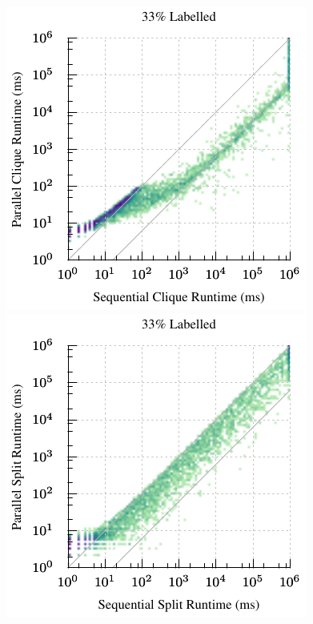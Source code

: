 \documentclass{llncs}
\begin{document}
\begin{figure}[p]
    \vspace*{2em}
    \centering
    \hspace*{0.5em}\includegraphics*[scale=0.7]{plots/33ved-par-heatmap-clique.pdf}\hfill
    \includegraphics*[scale=0.7]{plots/33ved-par-heatmap-james.pdf}\hspace*{0.5em}


\end{figure}
\end{document}
